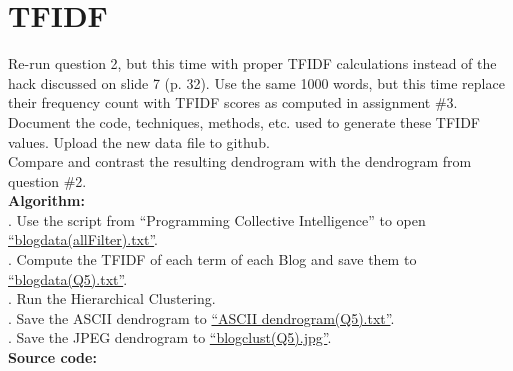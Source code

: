 \documentclass{article}
\begin{document}
		\section{TFIDF}
		Re-run question 2, but this time with proper TFIDF calculations instead of the hack discussed on slide 7 (p. 32). Use the same 1000 words, but this time replace their frequency count with TFIDF scores as computed in assignment \#3. Document the code, techniques, methods, etc. used to generate these TFIDF values. Upload the new data file to github.\\
		\indent Compare and contrast the resulting dendrogram with the dendrogram from question \#2.\\

		\noindent\textbf{Algorithm:}\\
		. Use the script from ``Programming Collective Intelligence'' to open \href{https://github.com/zhangboroy/cs532-s17/blob/master/assg08_submission/blogdata(allFilter).txt}{``blogdata(allFilter).txt''}.\\
		. Compute the TFIDF of each term of each Blog and save them to \href{https://github.com/zhangboroy/cs532-s17/blob/master/assg08_submission/blogdata(Q5).txt}{``blogdata(Q5).txt''}.\\
		. Run the Hierarchical Clustering.\\
		. Save the ASCII dendrogram to \href{https://github.com/zhangboroy/cs532-s17/blob/master/assg08_submission/ASCII%20dendrogram(Q5).txt}{``ASCII dendrogram(Q5).txt''}.\\
		. Save the JPEG dendrogram to \href{https://github.com/zhangboroy/cs532-s17/blob/master/assg08_submission/blogclust(Q5).jpg}{``blogclust(Q5).jpg''}.\\

		\noindent\textbf{Source code:}
		
		
\end{document}
